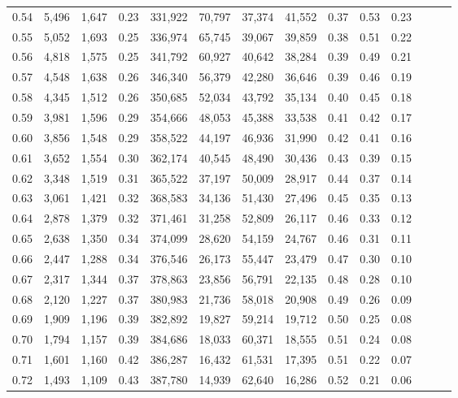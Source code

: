 \begin{tabular}{rrrrrrrrrrrrrr}
0.54 &  5,496 &  1,647 &  0.23 &  331,922 &   70,797 &  37,374 &  41,552 &  0.37 &  0.53 &      0.23 \\
0.55 &  5,052 &  1,693 &  0.25 &  336,974 &   65,745 &  39,067 &  39,859 &  0.38 &  0.51 &      0.22 \\
0.56 &  4,818 &  1,575 &  0.25 &  341,792 &   60,927 &  40,642 &  38,284 &  0.39 &  0.49 &      0.21 \\
0.57 &  4,548 &  1,638 &  0.26 &  346,340 &   56,379 &  42,280 &  36,646 &  0.39 &  0.46 &      0.19 \\
0.58 &  4,345 &  1,512 &  0.26 &  350,685 &   52,034 &  43,792 &  35,134 &  0.40 &  0.45 &      0.18 \\
0.59 &  3,981 &  1,596 &  0.29 &  354,666 &   48,053 &  45,388 &  33,538 &  0.41 &  0.42 &      0.17 \\
0.60 &  3,856 &  1,548 &  0.29 &  358,522 &   44,197 &  46,936 &  31,990 &  0.42 &  0.41 &      0.16 \\
0.61 &  3,652 &  1,554 &  0.30 &  362,174 &   40,545 &  48,490 &  30,436 &  0.43 &  0.39 &      0.15 \\
0.62 &  3,348 &  1,519 &  0.31 &  365,522 &   37,197 &  50,009 &  28,917 &  0.44 &  0.37 &      0.14 \\
0.63 &  3,061 &  1,421 &  0.32 &  368,583 &   34,136 &  51,430 &  27,496 &  0.45 &  0.35 &      0.13 \\
0.64 &  2,878 &  1,379 &  0.32 &  371,461 &   31,258 &  52,809 &  26,117 &  0.46 &  0.33 &      0.12 \\
0.65 &  2,638 &  1,350 &  0.34 &  374,099 &   28,620 &  54,159 &  24,767 &  0.46 &  0.31 &      0.11 \\
0.66 &  2,447 &  1,288 &  0.34 &  376,546 &   26,173 &  55,447 &  23,479 &  0.47 &  0.30 &      0.10 \\
0.67 &  2,317 &  1,344 &  0.37 &  378,863 &   23,856 &  56,791 &  22,135 &  0.48 &  0.28 &      0.10 \\
0.68 &  2,120 &  1,227 &  0.37 &  380,983 &   21,736 &  58,018 &  20,908 &  0.49 &  0.26 &      0.09 \\
0.69 &  1,909 &  1,196 &  0.39 &  382,892 &   19,827 &  59,214 &  19,712 &  0.50 &  0.25 &      0.08 \\
0.70 &  1,794 &  1,157 &  0.39 &  384,686 &   18,033 &  60,371 &  18,555 &  0.51 &  0.24 &      0.08 \\
0.71 &  1,601 &  1,160 &  0.42 &  386,287 &   16,432 &  61,531 &  17,395 &  0.51 &  0.22 &      0.07 \\
0.72 &  1,493 &  1,109 &  0.43 &  387,780 &   14,939 &  62,640 &  16,286 &  0.52 &  0.21 &      0.06 \\

\end{tabular}
